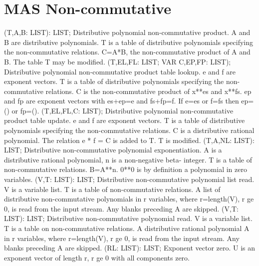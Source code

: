 \section{ MAS Non-commutative  } 
 (T,A,B: LIST): LIST; \eproc
\bcom Distributive polynomial non-commutative product.
A and B are distributive polynomials. T is a table
of distributive polynomials specifying the non-commutative
relations. C=A*B, the non-commutative product of A and B.
The table T may be modified.  \ecom 
{} (T,EL,FL: LIST; VAR C,EP,FP: LIST); \eproc
\bcom Distributive polynomial non-commutative product table lookup.
e and f are exponent vectors. T is a table
of distributive polynomials specifying the non-commutative
relations. C is the non-commutative product of x**es and x**fs.
ep and fp are exponent vectors with es+ep=e and fs+fp=f.
If e=es or f=fs then ep=() or fp=().  \ecom 
{} (T,EL,FL,C: LIST); \eproc
\bcom Distributive polynomial non-commutative product table update.
e and f are exponent vectors. T is a table
of distributive polynomials specifying the non-commutative
relations. C is a distributive rational polynomial. The relation
e * f = C is added to T. T is modified.  \ecom 
{} (T,A,NL: LIST): LIST; \eproc
\bcom Distributive non-commutative polynomial exponentiation. A is a
distributive rational polynomial, n is a non-negative beta-
integer. T is a table of non-commutative relations.
B=A**n. 0**0 is by definition a polynomial in zero variables.  \ecom 
{} (V,T: LIST): LIST; \eproc
\bcom Distributive non-commutative polynomial list read. V is a
variable list. T is a table of non-commutative relations.
A list of distributive non-commutative polynomials
in r variables, where r=length(V), r ge 0, is read from
the input stream. Any blanks preceding A are skipped.  \ecom 
{} (V,T: LIST): LIST; \eproc
\bcom Distributive non-commutative polynomial read. V is a variable list.
T is a table on non-commutative relations.
A distributive rational polynomial A in r variables, where
r=length(V), r ge 0, is read from the input stream. Any
blanks preceding A are skipped.  \ecom 
{} (RL: LIST): LIST; \eproc
\bcom Exponent vector zero. U is an exponent vector of length r,
r ge 0 with all components zero.  \ecom 
